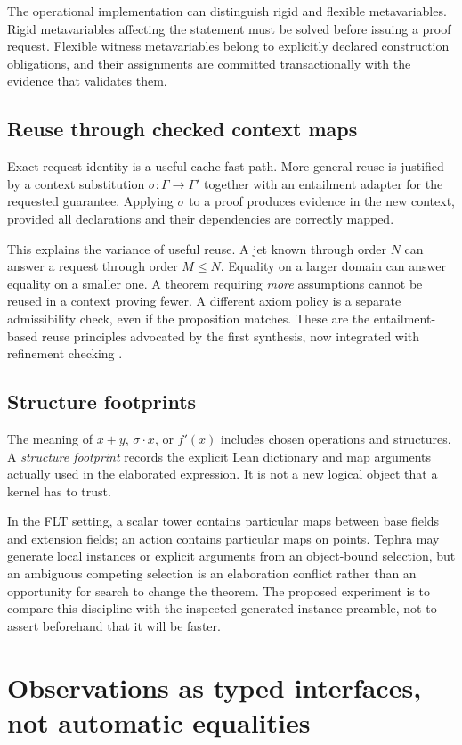 \documentclass[11pt,a4paper]{article}
\theoremstyle{plain}
\theoremstyle{definition}
\begin{document}
The operational implementation can distinguish rigid and flexible metavariables. Rigid metavariables affecting the statement must be solved before issuing a proof request. Flexible witness metavariables belong to explicitly declared construction obligations, and their assignments are committed transactionally with the evidence that validates them.

\subsection{Reuse through checked context maps}
Exact request identity is a useful cache fast path. More general reuse is justified by a context substitution $\sigma:\Gamma\to\Gamma'$ together with an entailment adapter for the requested guarantee. Applying $\sigma$ to a proof produces evidence in the new context, provided all declarations and their dependencies are correctly mapped.

This explains the variance of useful reuse. A jet known through order $N$ can answer a request through order $M\le N$. Equality on a larger domain can answer equality on a smaller one. A theorem requiring \emph{more} assumptions cannot be reused in a context proving fewer. A different axiom policy is a separate admissibility check, even if the proposition matches. These are the entailment-based reuse principles advocated by the first synthesis, now integrated with refinement checking \cite{synA}.

\subsection{Structure footprints}
The meaning of $x+y$, $\sigma\cdot x$, or $f'(x)$ includes chosen operations and structures. A \emph{structure footprint} records the explicit Lean dictionary and map arguments actually used in the elaborated expression. It is not a new logical object that a kernel has to trust.

In the FLT setting, a scalar tower contains particular maps between base fields and extension fields; an action contains particular maps on points. Tephra may generate local instances or explicit arguments from an object-bound selection, but an ambiguous competing selection is an elaboration conflict rather than an opportunity for search to change the theorem. The proposed experiment is to compare this discipline with the inspected generated instance preamble, not to assert beforehand that it will be faster.

\section{Observations as typed interfaces, not automatic equalities}\label{sec:observations}
\end{document}
